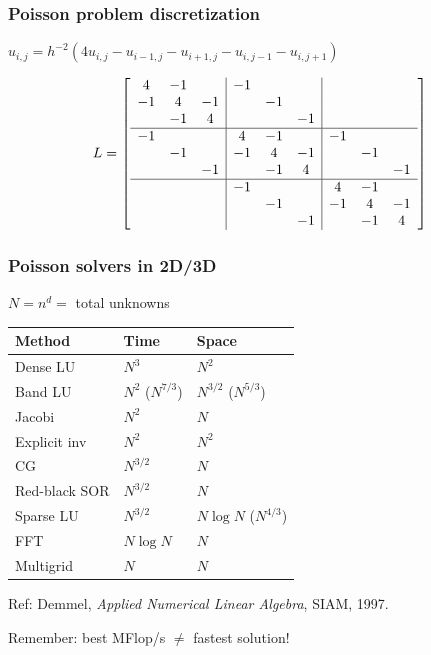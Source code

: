 \documentclass{beamer}
\begin{document}
\begin{frame}
  \frametitle{Poisson problem discretization}

  \begin{center}
  $
    u_{i,j} = h^{-2} \left( 4u_{i,j}-u_{i-1,j}-u_{i+1,j}-u_{i,j-1}-u_{i,j+1} \right)
  $
  \end{center}

  \[
  L =
  \left[
  \begin{array}{ccc|ccc|ccc}
     4 & -1 &    & -1 &    &    &    &    &    \\
    -1 &  4 & -1 &    & -1 &    &    &    &    \\
       & -1 &  4 &    &    & -1 &    &    &    \\ \hline
    -1 &    &    &  4 & -1 &    & -1 &    &    \\
       & -1 &    & -1 &  4 & -1 &    & -1 &    \\
       &    & -1 &    & -1 &  4 &    &    & -1 \\ \hline
       &    &    & -1 &    &    &  4 & -1 &    \\
       &    &    &    & -1 &    & -1 &  4 & -1 \\
       &    &    &    &    & -1 &    & -1 &  4 
  \end{array}
  \right]
  \]
\end{frame}


\begin{frame}
  \frametitle{Poisson solvers in 2D/3D}

  $N = n^d = $ total unknowns
  \vspace{2mm}

  \begin{tabular}{l|ll}
    Method & Time & Space \\ \hline
    Dense LU     & $N^3$          & $N^2$ \\
    Band LU      & $N^2$ ($N^{7/3}$) & $N^{3/2}$ ($N^{5/3}$) \\
    Jacobi       & $N^2$          & $N$ \\
    Explicit inv & $N^2$          & $N^2$ \\
    CG           & $N^{3/2}$       & $N$ \\
    Red-black SOR & $N^{3/2}$      & $N$ \\
    Sparse LU    & $N^{3/2}$       & $N \log N$ ($N^{4/3}$) \\
    FFT         & $N \log N$       & $N$ \\
    Multigrid   & $N$              & $N$
  \end{tabular}

  \vspace{5mm}
  Ref: Demmel, {\em Applied Numerical Linear Algebra}, SIAM, 1997.
  
  \vspace{5mm}
  Remember: best MFlop/s $\neq$ fastest solution!

\end{frame}
\end{document}
